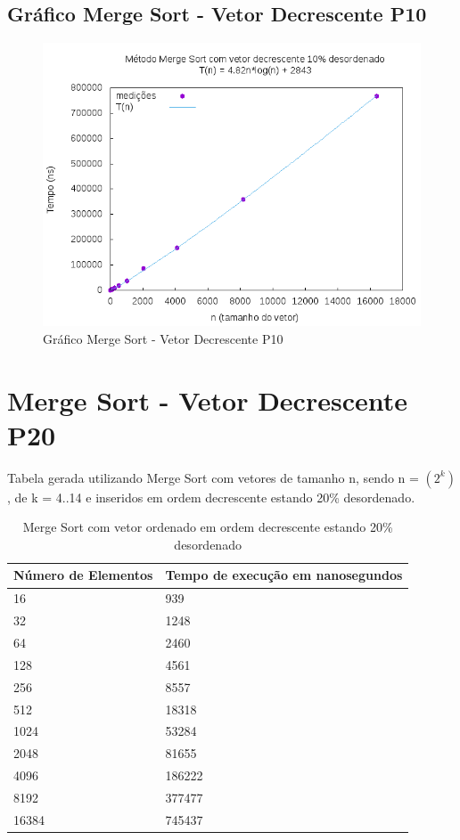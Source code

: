 \documentclass[12pt,a4paper,twoside]{report}
\begin{document}
\subsection{Gráfico Merge Sort - Vetor Decrescente P10}
\begin{figure}[H]
    \centering
    \includegraphics[width=0.7\linewidth]{graficos/MergeSort/vIntDecrescenteP10/vIntDecrescenteP10.png}
  \caption{Gráfico Merge Sort - Vetor Decrescente P10}
\end{figure}

\section{Merge Sort - Vetor Decrescente P20}
Tabela gerada utilizando Merge Sort com vetores de tamanho n, sendo n = $(2^k)$, de k = 4..14 e inseridos em ordem decrescente estando 20\% desordenado.
\begin{table}[H]
\centering
\caption{Merge Sort com vetor ordenado em ordem decrescente estando 20\% desordenado}
\label{my-label}
\begin{tabular}{|l|l|}
\hline
\multicolumn{1}{|c|}{\textbf{Número de Elementos}} & \multicolumn{1}{c|}{\textbf{Tempo de execução em nanosegundos}} \\ \hline
16 & 939 \\ \hline
32 & 1248 \\ \hline
64 & 2460 \\ \hline
128 & 4561 \\ \hline
256 & 8557 \\ \hline
512 & 18318 \\ \hline
1024 & 53284 \\ \hline
2048 & 81655 \\ \hline
4096 & 186222 \\ \hline
8192 & 377477 \\ \hline
16384 & 745437 \\ \hline
\end{tabular}
\end{table}
\end{document}
